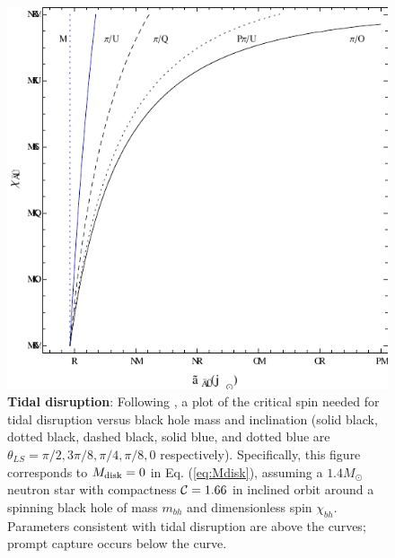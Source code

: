 \documentclass[nofootinbib,twocolumn,prd]{emulateapj}
\begin{document}
\begin{figure}
\includegraphics{Figures/fig-mma-TidalDisrupt-MbhA-VersusTheta}
\caption{\label{fig:TidalDisrupt}\textbf{Tidal disruption}:  Following  \citet{2012PhRvD..86l4007F}, a plot of
  the critical spin needed for tidal disruption versus black hole mass and inclination (solid black, dotted black,
  dashed black, solid blue, and dotted blue are $\theta_{LS}=\pi/2,3\pi/8,\pi/4, \pi/8,0$ respectively).  Specifically,
  this figure corresponds to $M_{\rm disk}=0$ in Eq. (\ref{eq:Mdisk}), assuming  a $1.4 M_\odot$ neutron star with compactness ${\cal
    C}=1.66$ in inclined orbit around a spinning black hole of mass $m_{bh}$ and dimensionless spin $\chi_{bh}$.
  Parameters consistent with tidal disruption are above the curves; prompt capture occurs below the
  curve.
}
\end{figure}
\end{document}
